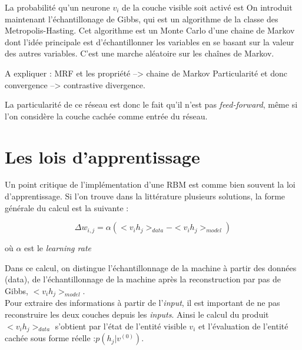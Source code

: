 \documentclass[a4paper,oneside]{report}
\begin{document}
                La probabilité qu'un neurone \begin{math}v_{i}\end{math} de la
                couche visible soit activé est 
                On introduit maintenant l'échantillonage de Gibbs, qui est un
                algorithme de la classe des Metropolis-Hasting. Cet algorithme
                est un Monte Carlo d'une chaine de Markov dont l'idée principale
                est d'échantillonner les variables en se basant sur la valeur
                des autres variables. C'est une marche aléatoire sur les chaînes
                de Markov.

                A expliquer : MRF et les propriété --> chaine de Markov
                Particularité et donc convergence --> contrastive divergence.

                La particularité de ce réseau est donc le fait qu'il n'est pas
                \textit{feed-forward}, même si l'on considère la couche cachée comme entrée du
                réseau.


            \section{Les lois d'apprentissage}

                Un point critique de l'implémentation d'une RBM est comme bien souvent la loi d'apprentissage.
                Si l'on trouve dans la littérature plusieurs solutions, la forme générale du calcul est la suivante :

                \begin{equation}
                    \Delta w_{i,j} = \alpha (<v_{i}h_{j}>_{data} - <v_{i}h_{j}>_{model} )
                \end{equation}
                
                où \begin{math}\alpha\end{math} est le \textit{learning rate}

                Dans ce calcul, on distingue l'échantillonnage de la machine à partir des données (data), de l'échantillonnage de la machine après la reconstruction par pas de Gibbs, \begin{math}<v_{i}h_{j}>_{model}\end{math}.\\
                
                Pour extraire des informations à partir de l'\textit{input}, il est important de ne pas reconstruire les deux couches depuis les \textit{inputs}.
                Ainsi le calcul du produit\begin{math}<v_{i}h_{j}>_{data}\end{math} s'obtient par l'état de l'entité visible \begin{math}v_{i}\end{math} et l'évaluation de l'entité cachée sous forme réelle :\begin{math}p(h_{j}|v^{(0)})\end{math}.
\end{document}
